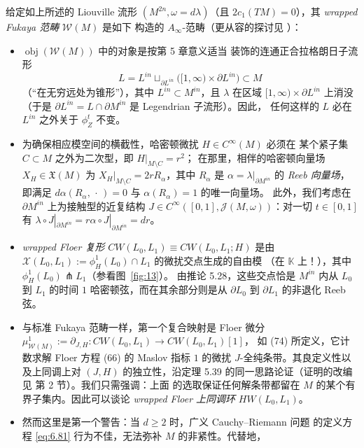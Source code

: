 给定如上所述的 Liouville 流形 $(M^{2n},\omega=d\lambda)$（且
$2c_1(TM)=0$），其 \emph{wrapped Fukaya 范畴} $\mathcal W(M)$ 是如下
构造的 $A_\infty$-范畴（更从容的探讨见 \cite{Abo10}）：

\begin{itemize}
  \item $\operatorname{obj}(\mathcal W(M))$ 中的对象是按第 5 章意义适当
  装饰的连通正合拉格朗日子流形
  \begin{equation}
  L=L^{in}\sqcup_{\partial L^{in}}\bigl([1,\infty)\times\partial L^{in}\bigr)
  \subset M
  \label{eq:6.100}
  \end{equation}
  （“在无穷远处为锥形”），其中 $L^{in}\subset M^{in}$，且 $\lambda$ 在区域
  $[1,\infty)\times\partial L^{in}$ 上消没（于是
  $\partial L^{in}=L\cap\partial M^{in}$ 是 Legendrian 子流形）。因此，
  任何这样的 $L$ 必在 $L^{in}$ 之外关于 $\phi^t_Z$ 不变。
  \item 为确保相应模空间的横截性，哈密顿微扰 $H\in C^\infty(M)$ 必须在
  某个紧子集 $C\subset M$ 之外为二次型，即 $H|_{M\setminus C}=r^2$；
  在那里，相伴的哈密顿向量场 $X_H\in\mathfrak X(M)$ 为
  $X_H|_{M\setminus C}=2rR_\alpha$，其中 $R_\alpha$ 是
  $\alpha=\lambda|_{\partial M^{in}}$ 的 \emph{Reeb 向量场}，即满足
  $d\alpha(R_\alpha,\,\cdot\,)=0$ 与 $\alpha(R_\alpha)=1$ 的唯一向量场。
  此外，我们考虑在 $\partial M^{in}$ 上为接触型的近复结构
  $J\in C^\infty([0,1],\mathcal J(M,\omega))$：对一切 $t\in[0,1]$ 有
  $\lambda\circ J|_{\partial M^{in}}=r\alpha\circ J|_{\partial M^{in}}=dr$。
  \item \emph{wrapped Floer 复形} $CW(L_0,L_1)\equiv CW(L_0,L_1;H)$
  是由
  $\mathcal X(L_0,L_1):=\phi^1_H(L_0)\cap L_1$ 的微扰交点生成的自由模
  （在 $\mathbb K$ 上！），其中 $\phi^1_H(L_0)\pitchfork L_1$（参看图~\ref{fig:13}）。
  由推论 5.28，这些交点恰是 $M^{in}$ 内从 $L_0$ 到 $L_1$ 的时间 $1$
  哈密顿弦，而在其余部分则是从 $\partial L_0$ 到 $\partial L_1$ 的非退化
  Reeb 弦。
  \item 与标准 Fukaya 范畴一样，第一个复合映射是 Floer 微分
  $\mu^1_{\mathcal W(M)}:=\partial_{J,H}:CW(L_0,L_1)\to CW(L_0,L_1)[1]$，
  如 (74) 所定义，它计数求解 Floer 方程 (66) 的 Maslov 指标 $1$ 的微扰
  $J$-全纯条带。其良定义性以及上同调上对 $(J,H)$ 的独立性，沿定理 5.39
  的同一思路论证（证明的改编见 \cite{Abo10} 第 2 节）。我们只需强调：上面
  的选取保证任何解条带都留在 $M$ 的某个有界子集内。因此可以谈论
  \emph{wrapped Floer 上同调环} $HW(L_0,L_1)$。
  \item 然而这里是第一个警告：当 $d\ge2$ 时，广义 Cauchy--Riemann 问题
  的定义方程 \eqref{eq:6.81} 行为不佳，无法弥补 $M$ 的非紧性。代替地，

\end{itemize}
